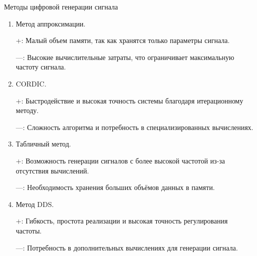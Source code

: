 \documentclass[10pt]{beamer}
\begin{document}
\begin{frame}{Методы цифровой генерации сигнала}
  \begin{enumerate}
		\item Метод аппроксимации. 
		
		+: Малый объем памяти, так как хранятся только параметры сигнала. 
		
		---: Высокие вычислительные затраты, что ограничивает максимальную частоту сигнала.
		
		\item CORDIC.
		
		+: Быстродействие и высокая точность системы благодаря итерационному методу.
		
		---: Сложность алгоритма и потребность в специализированных вычислениях.
		
		\item Табличный метод.
		
		+: Возможность генерации сигналов с более высокой частотой из-за отсутствия вычислений.
		
		---: Необходимость хранения больших объёмов данных в памяти.
		
		\item Метод DDS.
		
		+: Гибкость, простота реализации и высокая точность регулирования частоты.
		
		---: Потребность в дополнительных вычислениях для генерации сигнала.
  \end{enumerate}
\end{frame}



%
\end{document}
